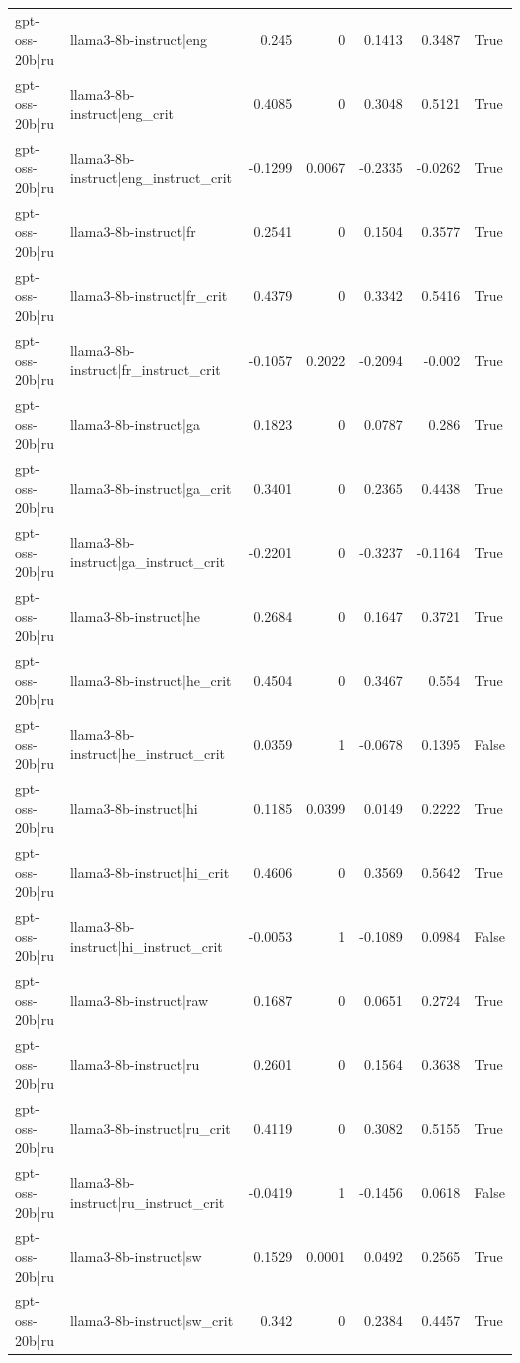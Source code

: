 \begin{table}
\begin{tabular}{l l r r r r l}
gpt-oss-20b|ru & llama3-8b-instruct|eng & 0.245 & 0 & 0.1413 & 0.3487 & True \\
gpt-oss-20b|ru & llama3-8b-instruct|eng_crit & 0.4085 & 0 & 0.3048 & 0.5121 & True \\
gpt-oss-20b|ru & llama3-8b-instruct|eng_instruct_crit & -0.1299 & 0.0067 & -0.2335 & -0.0262 & True \\
gpt-oss-20b|ru & llama3-8b-instruct|fr & 0.2541 & 0 & 0.1504 & 0.3577 & True \\
gpt-oss-20b|ru & llama3-8b-instruct|fr_crit & 0.4379 & 0 & 0.3342 & 0.5416 & True \\
gpt-oss-20b|ru & llama3-8b-instruct|fr_instruct_crit & -0.1057 & 0.2022 & -0.2094 & -0.002 & True \\
gpt-oss-20b|ru & llama3-8b-instruct|ga & 0.1823 & 0 & 0.0787 & 0.286 & True \\
gpt-oss-20b|ru & llama3-8b-instruct|ga_crit & 0.3401 & 0 & 0.2365 & 0.4438 & True \\
gpt-oss-20b|ru & llama3-8b-instruct|ga_instruct_crit & -0.2201 & 0 & -0.3237 & -0.1164 & True \\
gpt-oss-20b|ru & llama3-8b-instruct|he & 0.2684 & 0 & 0.1647 & 0.3721 & True \\
gpt-oss-20b|ru & llama3-8b-instruct|he_crit & 0.4504 & 0 & 0.3467 & 0.554 & True \\
gpt-oss-20b|ru & llama3-8b-instruct|he_instruct_crit & 0.0359 & 1 & -0.0678 & 0.1395 & False \\
gpt-oss-20b|ru & llama3-8b-instruct|hi & 0.1185 & 0.0399 & 0.0149 & 0.2222 & True \\
gpt-oss-20b|ru & llama3-8b-instruct|hi_crit & 0.4606 & 0 & 0.3569 & 0.5642 & True \\
gpt-oss-20b|ru & llama3-8b-instruct|hi_instruct_crit & -0.0053 & 1 & -0.1089 & 0.0984 & False \\
gpt-oss-20b|ru & llama3-8b-instruct|raw & 0.1687 & 0 & 0.0651 & 0.2724 & True \\
gpt-oss-20b|ru & llama3-8b-instruct|ru & 0.2601 & 0 & 0.1564 & 0.3638 & True \\
gpt-oss-20b|ru & llama3-8b-instruct|ru_crit & 0.4119 & 0 & 0.3082 & 0.5155 & True \\
gpt-oss-20b|ru & llama3-8b-instruct|ru_instruct_crit & -0.0419 & 1 & -0.1456 & 0.0618 & False \\
gpt-oss-20b|ru & llama3-8b-instruct|sw & 0.1529 & 0.0001 & 0.0492 & 0.2565 & True \\
gpt-oss-20b|ru & llama3-8b-instruct|sw_crit & 0.342 & 0 & 0.2384 & 0.4457 & True \\

\end{tabular}
\end{table}

